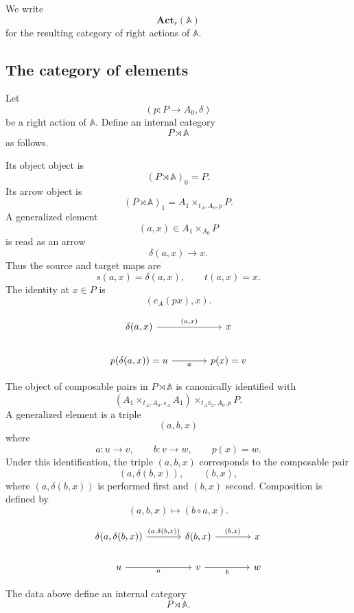 We write
\[
\mathbf{Act}_r(\mathbb A)
\]
for the resulting category of right actions of \(\mathbb A\).

\subsection{The category of elements}
\label{subsec:category-of-elements-derived-rewritten}

Let
\[
(p:P\to A_0,\delta)
\]
be a right action of \(\mathbb A\). Define an internal category
\[
P\rtimes\mathbb A
\]
as follows.

Its object object is
\[
(P\rtimes\mathbb A)_0=P.
\]
Its arrow object is
\[
(P\rtimes\mathbb A)_1
=
A_1\times_{t_A,A_0,p}P.
\]
A generalized element
\[
(a,x)\in A_1\times_{A_0}P
\]
is read as an arrow
\[
\delta(a,x)\longrightarrow x.
\]
Thus the source and target maps are
\[
s(a,x)=\delta(a,x),
\qquad
t(a,x)=x.
\]
The identity at \(x\in P\) is
\[
(e_A(px),x).
\]

\[
\begin{tikzcd}[column sep=large]
\delta(a,x)
\arrow[r, "{(a,x)}"]
&
x
\\
p(\delta(a,x))=u
\arrow[r, "a"']
&
p(x)=v
\end{tikzcd}
\]

The object of composable pairs in \(P\rtimes\mathbb A\) is canonically
identified with
\[
\left(A_1\times_{t_A,A_0,s_A}A_1\right)
\times_{t_A\pi_2,A_0,p}
P.
\]
A generalized element is a triple
\[
(a,b,x)
\]
where
\[
a:u\to v,
\qquad
b:v\to w,
\qquad
p(x)=w.
\]
Under this identification, the triple \((a,b,x)\) corresponds to the
composable pair
\[
(a,\delta(b,x)),
\qquad
(b,x),
\]
where \((a,\delta(b,x))\) is performed first and \((b,x)\) second.
Composition is defined by
\[
(a,b,x)\longmapsto (b\circ a,x).
\]

\[
\begin{tikzcd}[column sep=large]
\delta(a,\delta(b,x))
\arrow[r, "{(a,\delta(b,x))}"]
&
\delta(b,x)
\arrow[r, "{(b,x)}"]
&
x
\\
u
\arrow[r, "a"']
&
v
\arrow[r, "b"']
&
w
\end{tikzcd}
\]

\begin{proposition}
\label{prop:action-category-of-elements-rewritten}
The data above define an internal category
\[
P\rtimes\mathbb A.
\]
\end{proposition}

